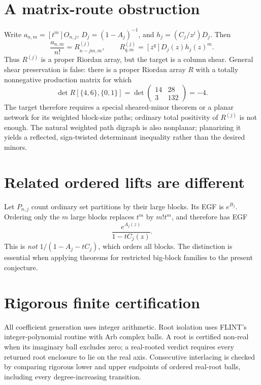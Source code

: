 \documentclass[11pt]{article}
\theoremstyle{definition}
\newcommand{\OO}{O}
\begin{document}
\section{A matrix-route obstruction}

Write \(a_{n,m}=[t^m]\OO_{n,j}\), \(D_j=(1-A_j)^{-1}\), and
\(h_j=(C_j/z^j)D_j\). Then
\[
\frac{a_{n,m}}{n!}=R^{(j)}_{n-jm,m},\qquad
R^{(j)}_{q,m}=[z^q]D_j(z)h_j(z)^m.
\]
Thus \(R^{(j)}\) is a proper Riordan array, but the target is a column shear.
General shear preservation is false: there is a proper Riordan array \(R\)
with a totally nonnegative production matrix for which
\[
\det R[\{4,6\},\{0,1\}]
=\det\begin{pmatrix}14&28\\3&132\end{pmatrix}=-4.
\]
The target therefore requires a special sheared-minor theorem or a planar
network for its weighted block-size paths; ordinary total positivity of
\(R^{(j)}\) is not enough. The natural weighted path digraph is also
nonplanar; planarizing it yields a reflected, sign-twisted determinant
inequality rather than the desired minors.

\section{Related ordered lifts are different}

Let \(P_{n,j}\) count ordinary set partitions by their large blocks.  Its EGF
is \(e^{B_j}\).  Ordering only the \(m\) large blocks replaces \(t^m\) by
\(m!t^m\), and therefore has EGF
\[
\frac{e^{A_j(z)}}{1-tC_j(z)}.
\]
This is \emph{not} \(1/(1-A_j-tC_j)\), which orders all blocks.  The
distinction is essential when applying theorems for restricted big-block
families to the present conjecture.

\section{Rigorous finite certification}

All coefficient generation uses integer arithmetic.  Root isolation uses
FLINT's integer-polynomial routine with Arb complex balls.  A root is
certified non-real when its imaginary ball excludes zero; a real-rooted
verdict requires every returned root enclosure to lie on the real axis.
Consecutive interlacing is checked by comparing rigorous lower and upper
endpoints of ordered real-root balls, including every degree-increasing
transition.
\end{document}
